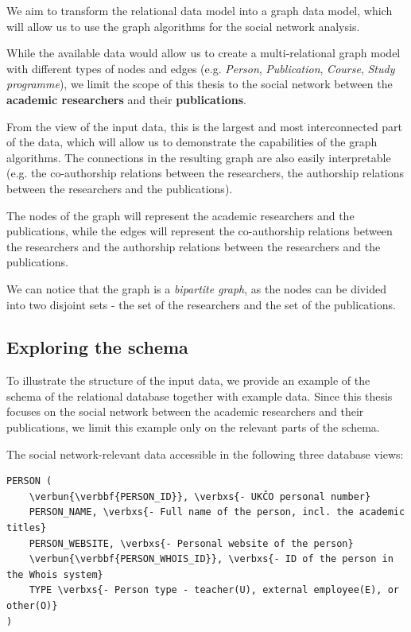 We aim to transform the relational data model into a graph data model, which will allow us to use the graph algorithms for the social network analysis.

While the available data would allow us to create a multi-relational graph model with different types of nodes and edges (e.g. \textit{Person}, \textit{Publication}, \textit{Course}, \textit{Study programme}), 
we limit the scope of this thesis to the social network between the \textbf{academic researchers} and their \textbf{publications}.

From the view of the input data, this is the largest and most interconnected part of the data, which will allow us to demonstrate the capabilities of the graph algorithms.
The connections in the resulting graph are also easily interpretable (e.g. the co-authorship relations between the researchers, the authorship relations between the researchers and the publications).

The nodes of the graph will represent the academic researchers and the publications, while the edges will represent the co-authorship relations between the researchers and the authorship relations between the researchers and the publications.

We can notice that the graph is a \textit{bipartite graph}, as the nodes can be divided into two disjoint sets - the set of the researchers and the set of the publications.

\subsection{Exploring the schema}

To illustrate the structure of the input data, we provide an example of the schema of the relational database together with example data.
Since this thesis focuses on the social network between the academic researchers and their publications, we limit this example only on the relevant parts of the schema.

The social network-relevant data accessible in the following three database views:

\begin{Verbatim}[commandchars=\\\{\}]
PERSON (
    \verbun{\verbbf{PERSON_ID}}, \verbxs{- UKČO personal number}
    PERSON_NAME, \verbxs{- Full name of the person, incl. the academic titles}
    PERSON_WEBSITE, \verbxs{- Personal website of the person}
    \verbun{\verbbf{PERSON_WHOIS_ID}}, \verbxs{- ID of the person in the Whois system}
    TYPE \verbxs{- Person type - teacher(U), external employee(E), or other(O)}
)
\end{Verbatim}

